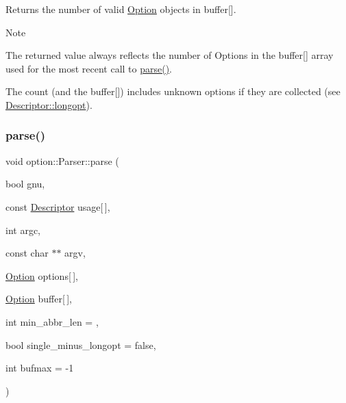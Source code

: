 Returns the number of valid \hyperlink{classoption_1_1_option}{Option} objects in {\ttfamily buffer}\mbox{[}\mbox{]}. 

\begin{DoxyNote}{Note}
\begin{DoxyItemize}
\item The returned value always reflects the number of Options in the buffer\mbox{[}\mbox{]} array used for the most recent call to \hyperlink{classoption_1_1_parser_a6e0b5778d1cfbd6cd51240e74d01e138}{parse()}. \item The count (and the buffer\mbox{[}\mbox{]}) includes unknown options if they are collected (see \hyperlink{structoption_1_1_descriptor_a470c449dfa894c9bfda2dae026142b4b}{Descriptor\+::longopt}). \end{DoxyItemize}

\end{DoxyNote}
\mbox{\label{classoption_1_1_parser_a6e0b5778d1cfbd6cd51240e74d01e138}} 
\subsubsection{\texorpdfstring{parse()}{parse()}}
{\footnotesize\ttfamily void option\+::\+Parser\+::parse (\begin{DoxyParamCaption}\item[{bool}]{gnu,  }\item[{const \hyperlink{structoption_1_1_descriptor}{Descriptor}}]{usage\mbox{[}$\,$\mbox{]},  }\item[{int}]{argc,  }\item[{const char $\ast$$\ast$}]{argv,  }\item[{\hyperlink{classoption_1_1_option}{Option}}]{options\mbox{[}$\,$\mbox{]},  }\item[{\hyperlink{classoption_1_1_option}{Option}}]{buffer\mbox{[}$\,$\mbox{]},  }\item[{int}]{min\+\_\+abbr\+\_\+len = {},  }\item[{bool}]{single\+\_\+minus\+\_\+longopt = {\ttfamily false},  }\item[{int}]{bufmax = {\ttfamily -\/1} }\end{DoxyParamCaption})\hspace{0.3cm}{\ttfamily [inline]}}



